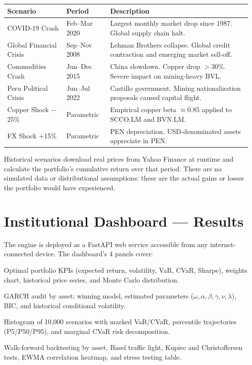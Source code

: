 \documentclass[11pt,a4paper]{article}
\begin{document}
\begin{center}
\begin{tabular}{l l l}
\toprule
\textbf{Scenario} & \textbf{Period} & \textbf{Description} \\
\midrule
COVID-19 Crash & Feb--Mar 2020 & \parbox[t]{8.5cm}{Largest monthly market drop since 1987. Global supply chain halt.} \\[3pt]
Global Financial Crisis & Sep--Nov 2008 & \parbox[t]{8.5cm}{Lehman Brothers collapse. Global credit contraction and emerging market sell-off.} \\[3pt]
Commodities Crash & Jun--Dec 2015 & \parbox[t]{8.5cm}{China slowdown. Copper drop $>$30\%. Severe impact on mining-heavy BVL.} \\[3pt]
Peru Political Crisis & Jun--Jul 2022 & \parbox[t]{8.5cm}{Castillo government. Mining nationalization proposals caused capital flight.} \\[3pt]
Copper Shock $-$25\% & Parametric & \parbox[t]{8.5cm}{Empirical copper beta $\approx 0.85$ applied to SCCO.LM and BVN.LM.} \\[3pt]
FX Shock $+$15\% & Parametric & \parbox[t]{8.5cm}{PEN depreciation. USD-denominated assets appreciate in PEN.} \\
\bottomrule
\end{tabular}
\end{center}

Historical scenarios download real prices from Yahoo Finance at runtime
and calculate the portfolio's cumulative return over that period. There are no simulated data or
distributional assumptions: these are the actual gains or losses the portfolio would have experienced.

\section{Institutional Dashboard — Results}

The engine is deployed as a FastAPI web service accessible from any internet-connected
device. The dashboard's 4 panels cover:

\begin{description}[leftmargin=2cm]
    \item[\textbf{Overview:}] Optimal portfolio KPIs (expected return, volatility, VaR,
    CVaR, Sharpe), weights chart, historical price series, and Monte Carlo distribution.
    \item[\textbf{Risk Analytics:}] GARCH audit by asset: winning model, estimated parameters
    ($\omega, \alpha, \beta, \gamma, \nu, \lambda$), BIC, and historical conditional volatility.
    \item[\textbf{Monte Carlo:}] Histogram of 10,000 scenarios with marked VaR/CVaR,
    percentile trajectories (P5/P50/P95), and marginal CVaR risk decomposition.
    \item[\textbf{Validation \& Stress:}] Walk-forward backtesting by asset, Basel traffic light,
    Kupiec and Christoffersen tests, EWMA correlation heatmap, and stress testing table.
\end{description}
\end{document}
